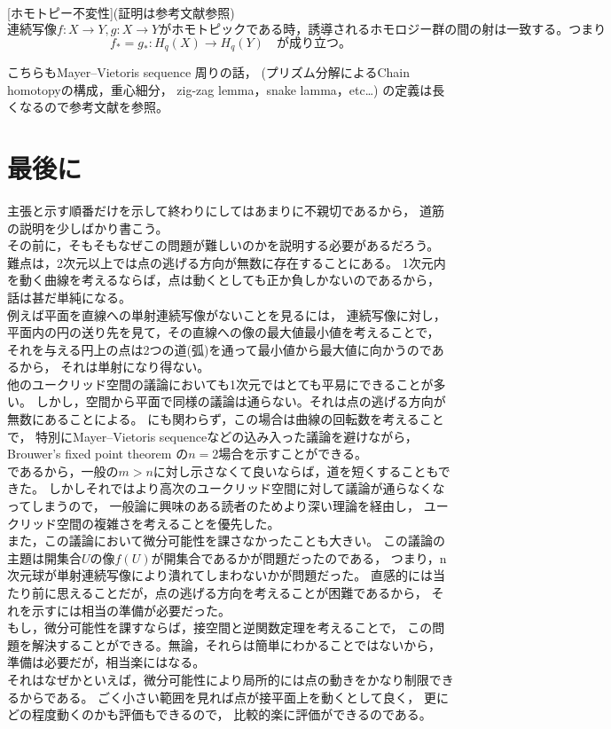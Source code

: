 \documentclass[uplatex]{jsarticle}
\begin{document}
\begin{fact}\label{Fact:Invariance of homotopy}[ホモトピー不変性](証明は参考文献\cite{kawazumi}参照)\\

    \(
    連続写像f: X \to Y , g: X \to Y がホモトピックである時，
    誘導されるホモロジー群の間の射は一致する。つまり
    \)
    \[
        f_*=g_*:H_q(X)\to H_q(Y) \quad が成り立つ。
    \]

\end{fact}

こちらもMayer--Vietoris sequence 周りの話，
(プリズム分解によるChain homotopyの構成，重心細分，
zig-zag lemma，snake lamma，etc…)
の定義は長くなるので参考文献\cite{kawazumi}を参照。




\section{最後に}

主張と示す順番だけを示して終わりにしてはあまりに不親切であるから，
道筋の説明を少しばかり書こう。\\
その前に，そもそもなぜこの問題が難しいのかを説明する必要があるだろう。
難点は，2次元以上では点の逃げる方向が無数に存在することにある。
1次元内を動く曲線を考えるならば，点は動くとしても正か負しかないのであるから，
話は甚だ単純になる。\\
例えば平面を直線への単射連続写像がないことを見るには，
連続写像に対し，平面内の円の送り先を見て，その直線への像の最大値最小値を考えることで，
それを与える円上の点は2つの道(弧)を通って最小値から最大値に向かうのであるから，
それは単射になり得ない。\\
他のユークリッド空間の議論においても1次元ではとても平易にできることが多い。
しかし，空間から平面で同様の議論は通らない。それは点の逃げる方向が無数にあることによる。
にも関わらず，この場合は曲線の回転数を考えることで，
特別にMayer--Vietoris sequenceなどの込み入った議論を避けながら，
Brouwer's fixed point theorem の\(n=2\)場合を示すことができる。\\
であるから，一般の\(m>n\)に対し示さなくて良いならば，道を短くすることもできた。
しかしそれではより高次のユークリッド空間に対して議論が通らなくなってしまうので，
一般論に興味のある読者のためより深い理論を経由し，
ユークリッド空間の複雑さを考えることを優先した。\\
また，この議論において微分可能性を課さなかったことも大きい。
この議論の主題は開集合\(Uの像f(U)\)が開集合であるかが問題だったのである，
つまり，n次元球が単射連続写像により潰れてしまわないかが問題だった。
直感的には当たり前に思えることだが，点の逃げる方向を考えることが困難であるから，
それを示すには相当の準備が必要だった。\\
もし，微分可能性を課すならば，接空間と逆関数定理を考えることで，
この問題を解決することができる。無論，それらは簡単にわかることではないから，
準備は必要だが，相当楽にはなる。\\
それはなぜかといえば，微分可能性により局所的には点の動きをかなり制限できるからである。
ごく小さい範囲を見れば点が接平面上を動くとして良く，
更にどの程度動くのかも評価もできるので，
比較的楽に評価ができるのである。\\
\end{document}
